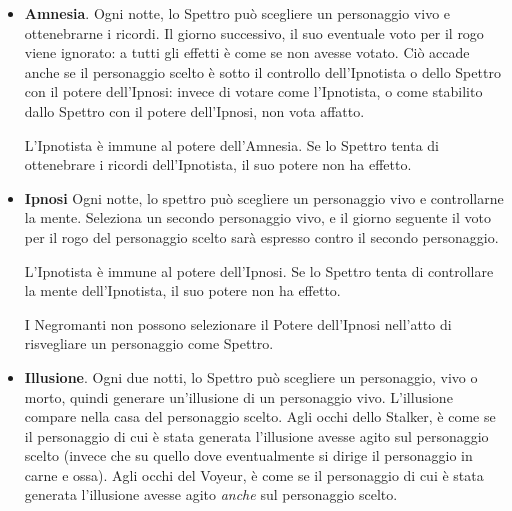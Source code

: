 \documentclass[a4paper,10pt]{article}
\begin{document}
\begin{itemize}
 \item {\bf Amnesia}. Ogni notte, lo Spettro può scegliere un personaggio vivo e ottenebrarne i ricordi. Il giorno successivo, il suo eventuale voto per il rogo viene ignorato: a tutti gli effetti è come se non avesse votato. Ciò accade anche se il personaggio scelto è sotto il controllo dell'Ipnotista o dello Spettro con il potere dell'Ipnosi: invece di votare come l'Ipnotista, o come stabilito dallo Spettro con il potere dell'Ipnosi, non vota affatto.
 
 L'Ipnotista è immune al potere dell'Amnesia. Se lo Spettro tenta di ottenebrare i ricordi dell'Ipnotista, il suo potere non ha effetto.
 

\item{\bf Ipnosi} Ogni notte, lo spettro può scegliere un personaggio vivo e controllarne la mente. Seleziona un secondo personaggio vivo, e il giorno seguente il voto per il rogo del personaggio scelto sarà espresso contro il secondo personaggio.

L'Ipnotista è immune al potere dell'Ipnosi. Se lo Spettro tenta di controllare la mente dell'Ipnotista, il suo potere non ha effetto.

I Negromanti non possono selezionare il Potere dell'Ipnosi nell'atto di risvegliare un personaggio come Spettro.



 \item {\bf Illusione}. Ogni due notti, lo Spettro può scegliere un personaggio, vivo o morto, quindi generare un'illusione di un personaggio vivo. L'illusione compare nella casa del personaggio scelto.
 Agli occhi dello Stalker, è come se il personaggio di cui è stata generata l'illusione avesse agito sul personaggio scelto (invece che su quello dove eventualmente si dirige il personaggio in carne e ossa). %
 Agli occhi del Voyeur, è come se il personaggio di cui è stata generata l'illusione avesse agito \emph{anche} sul personaggio scelto.


\end{itemize}
\end{document}
